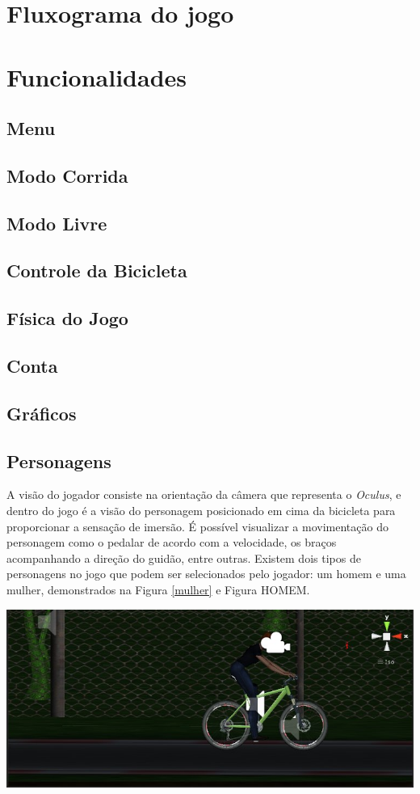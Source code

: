 \section{Fluxograma do jogo}
\section{Funcionalidades}
\subsection{Menu}
\subsection{Modo Corrida}
\subsection{Modo Livre}
\subsection{Controle da Bicicleta}
\subsection{Física do Jogo}
\subsection{Conta}
\subsection{Gráficos}

\subsection{Personagens}
A visão do jogador consiste na orientação da câmera que representa o \textit{Oculus}, e dentro do jogo é a visão do personagem posicionado em cima da bicicleta para proporcionar a sensação de imersão. É possível visualizar a movimentação do personagem como o pedalar de acordo com a velocidade, os braços acompanhando a direção do guidão, entre outras. Existem dois tipos de personagens no jogo que podem ser selecionados pelo jogador: um homem e uma mulher, demonstrados na Figura \ref{mulher} e Figura HOMEM. 

\begin{center}
	\label{mulher}
	\includegraphics[scale=0.4]{figuras/mulher}
\end{center}

